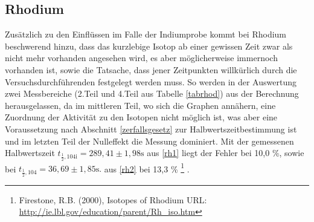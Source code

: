 \subsection{Rhodium}
Zusätzlich zu den Einflüssen im Falle der Indiumprobe kommt bei Rhodium beschwerend hinzu, dass das kurzlebige Isotop ab einer gewissen
Zeit zwar als nicht mehr vorhanden angesehen wird, es aber möglicherweise immernoch vorhanden ist, sowie die Tatsache, dass jener Zeitpunkten
willkürlich durch die Versuchsdurchführenden festgelegt werden muss. So werden in der Auswertung zwei Messbereiche (2.Teil und 4.Teil aus Tabelle \ref{tabrhod}) aus der Berechnung
herausgelassen, da im mittleren Teil, wo sich die Graphen annähern, eine Zuordnung der Aktivität zu den Isotopen nicht möglich ist, was
aber eine Voraussetzung nach Abschnitt \ref{zerfallsgesetz} zur Halbwertszeitbestimmung ist und im letzten Teil der Nulleffekt die Messung
dominiert. Mit der gemessenen Halbwertszeit $t_{\frac12,\text{104i}} = 289,41 \pm 1,98 \text{s}$ aus \eqref{rh1}
liegt der Fehler bei 10,0 \%, sowie bei $t_{\frac12,\text{104}} = 36,69 \pm 1,85 \text{s}.$ aus \eqref{rh2} bei 13,3 \% \footnote[2]{Firestone, R.B. (2000), Isotopes of Rhodium URL: \href{http://ie.lbl.gov/education/parent/Rh\_iso.htm}{http://ie.lbl.gov/education/parent/Rh\_iso.htm}} . 





